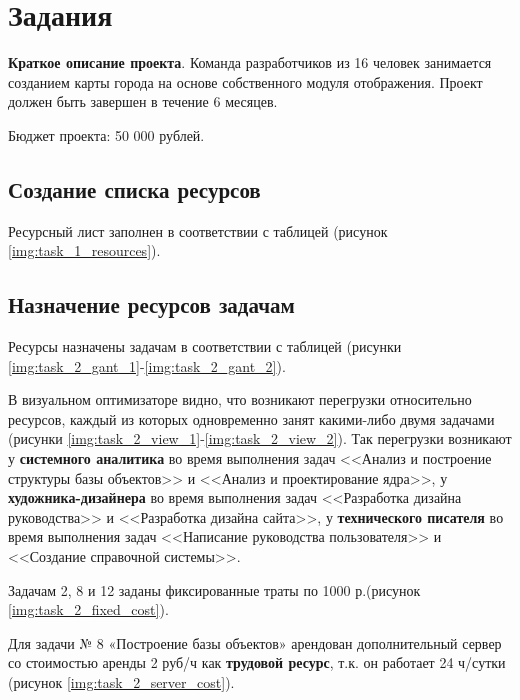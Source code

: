 \chapter{Задания}

\textbf{Краткое описание проекта}. Команда разработчиков из 16 человек занимается созданием карты
города на основе собственного модуля отображения. Проект должен быть завершен в течение
6 месяцев. 

Бюджет проекта: 50 000 рублей.

\section{Создание списка ресурсов}

Ресурсный лист заполнен в соответствии с таблицей (рисунок \ref{img:task_1_resources}).

\section{Назначение ресурсов задачам}

Ресурсы назначены задачам 
в соответствии с таблицей (рисунки \ref{img:task_2_gant_1}-\ref{img:task_2_gant_2}).

В визуальном оптимизаторе видно, что возникают перегрузки относительно ресурсов, каждый из которых
одновременно занят какими-либо двумя задачами (рисунки \ref{img:task_2_view_1}-\ref{img:task_2_view_2}).
Так перегрузки возникают у \textbf{системного аналитика} во время выполнения задач <<Анализ и построение структуры базы объектов>> и <<Анализ и проектирование ядра>>, у \textbf{художника-дизайнера} во время выполнения задач <<Разработка дизайна руководства>> и <<Разработка дизайна сайта>>, у \textbf{технического писателя} во время выполнения задач <<Написание руководства пользователя>> и <<Создание справочной системы>>.

Задачам 2, 8 и 12 заданы фиксированные траты по 1000 р.(рисунок \ref{img:task_2_fixed_cost}).

Для задачи № 8 «Построение базы объектов» арендован дополнительный 
сервер со стоимостью аренды 2 руб/ч как \textbf{трудовой ресурс}, т.к. он работает 24 ч/сутки
(рисунок \ref{img:task_2_server_cost}).


